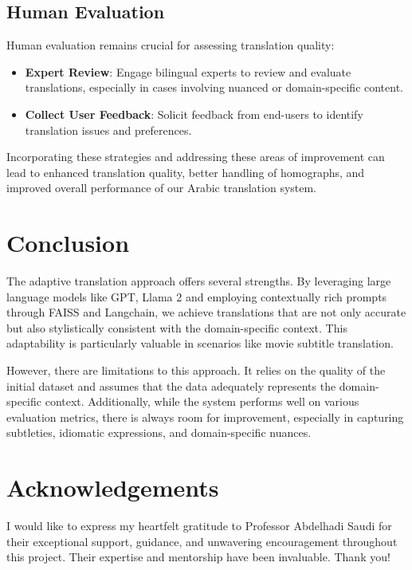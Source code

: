 \documentclass[12pt]{article}
\begin{document}
\subsection{Human Evaluation}

Human evaluation remains crucial for assessing translation quality:

\begin{itemize}
	\item \textbf{Expert Review}: Engage bilingual experts to review and evaluate translations, especially in cases involving nuanced or domain-specific content.
	\item \textbf{Collect User Feedback}: Solicit feedback from end-users to identify translation issues and preferences.
\end{itemize}

Incorporating these strategies and addressing these areas of improvement can lead to enhanced translation quality, better handling of homographs, and improved overall performance of our Arabic translation system.


\section{Conclusion}
The adaptive translation approach offers several strengths. By leveraging large language models like GPT, Llama 2 and employing contextually rich prompts through FAISS and Langchain, we achieve translations that are not only accurate but also stylistically consistent with the domain-specific context. This adaptability is particularly valuable in scenarios like movie subtitle translation.

However, there are limitations to this approach. It relies on the quality of the initial dataset and assumes that the data adequately represents the domain-specific context. Additionally, while the system performs well on various evaluation metrics, there is always room for improvement, especially in capturing subtleties, idiomatic expressions, and domain-specific nuances.

\section{Acknowledgements}

I would like to express my heartfelt gratitude to Professor Abdelhadi Saudi for their exceptional support, guidance, and unwavering encouragement throughout this project. Their expertise and mentorship have been invaluable. Thank you!

\newpage

\end{document}
